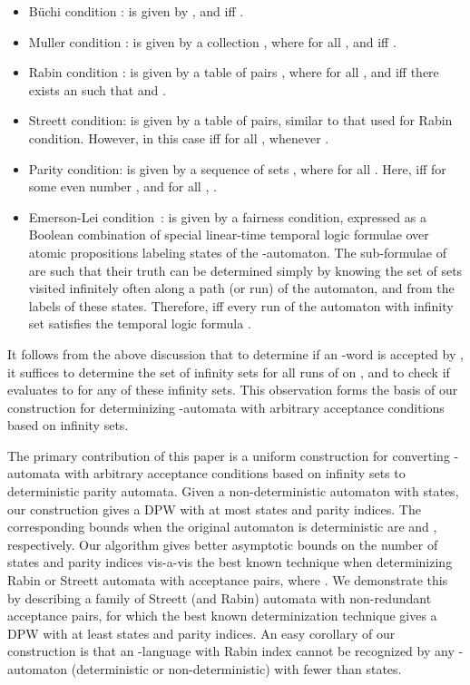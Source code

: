 \documentclass[3p]{elsarticle}
\newcommand{\buchi}{B\"{u}chi}
\begin{document}
\begin{itemize} 
\item {\buchi} condition :  is given by , and
   iff .

\item Muller condition :  is given by a collection , where  for all , and  iff .

\item Rabin condition :  is given by a table of pairs
  , where
   for all , and
   iff there exists an 
  such that  and .

\item Streett condition:  is given by a table of pairs, similar
  to that used for Rabin condition.  However, in this case  iff for all ,  whenever .

\item Parity condition:  is given by a sequence of sets
  , where  for all .  Here,  iff for some even number ,  and for all , .

\item Emerson-Lei condition~\cite{emersonlai}:  is given by a
  fairness condition, expressed as a Boolean combination  of
  special linear-time temporal logic formulae over atomic propositions
  labeling states of the -automaton.  The sub-formulae of 
  are such that their truth can be determined simply by knowing the
  set of sets visited infinitely often along a path (or run) of the
  automaton, and from the labels of these states.  Therefore,
   iff every run of the automaton with infinity set
   satisfies the temporal logic formula .
\end{itemize}
It follows from the above discussion that to determine if an
-word  is accepted by , it suffices to determine
the set of infinity sets for all runs of  on , and to
check if  evaluates to  for any of these infinity sets.
This observation forms the basis of our construction for determinizing
-automata with arbitrary acceptance conditions based on
infinity sets.

The primary contribution of this paper is a uniform construction for
converting -automata with arbitrary acceptance conditions
based on infinity sets to deterministic parity automata.  Given a
non-deterministic automaton with  states, our construction gives a
DPW with at most  states and  parity
indices.  The corresponding bounds when the original automaton is
deterministic are  and , respectively.  Our algorithm
gives better asymptotic bounds on the number of states and parity
indices vis-a-vis the best known technique when determinizing Rabin
or Streett automata with  acceptance pairs, where .  We demonstrate this by describing a family of Streett (and Rabin)
automata with  non-redundant acceptance pairs, for which the
best known determinization technique gives a DPW with at least
 states and  parity indices.  An easy corollary
  of our construction is that an -language with Rabin index
   cannot be recognized by any -automaton (deterministic or
  non-deterministic) with fewer than  states.
\end{document}
